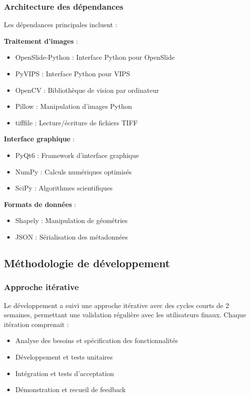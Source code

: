 \documentclass[12pt,a4paper]{report}
\begin{document}
\subsubsection{Architecture des dépendances}

Les dépendances principales incluent :

\textbf{Traitement d'images} :
\begin{itemize}
\item OpenSlide-Python : Interface Python pour OpenSlide
\item PyVIPS : Interface Python pour VIPS
\item OpenCV : Bibliothèque de vision par ordinateur
\item Pillow : Manipulation d'images Python
\item tifffile : Lecture/écriture de fichiers TIFF
\end{itemize}

\textbf{Interface graphique} :
\begin{itemize}
\item PyQt6 : Framework d'interface graphique
\item NumPy : Calculs numériques optimisés
\item SciPy : Algorithmes scientifiques
\end{itemize}

\textbf{Formats de données} :
\begin{itemize}
\item Shapely : Manipulation de géométries
\item JSON : Sérialisation des métadonnées
\end{itemize}

\subsection{Méthodologie de développement}

\subsubsection{Approche itérative}

Le développement a suivi une approche itérative avec des cycles courts de 2 semaines, permettant une validation régulière avec les utilisateurs finaux. Chaque itération comprenait :
\begin{itemize}
\item Analyse des besoins et spécification des fonctionnalités
\item Développement et tests unitaires
\item Intégration et tests d'acceptation
\item Démonstration et recueil de feedback
\end{itemize}
\end{document}
